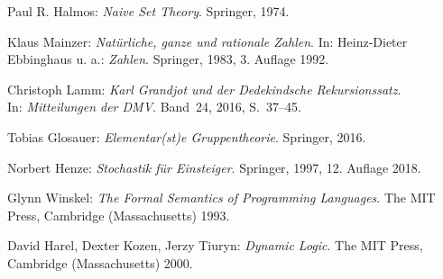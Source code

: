\begin{thebibliography}{00}
 Paul R. Halmos:
\emph{Naive Set Theory}. Springer, 1974.

 Klaus Mainzer:
\emph{Natürliche, ganze und rationale Zahlen}.
In: Heinz-Dieter Ebbinghaus u. a.: \emph{Zahlen}.
Springer, 1983, 3. Auflage 1992.

 Christoph Lamm:
\emph{Karl Grandjot und der Dedekindsche Rekursionssatz}.\\
In: \emph{Mitteilungen der DMV}. Band~24, 2016, S.~37--45.

 Tobias Glosauer:
\emph{Elementar(st)e Gruppentheorie}.
Springer, 2016.

 Norbert Henze: \emph{Stochastik für Einsteiger}.
Springer, 1997, 12. Auflage 2018.

 Glynn Winskel:
\emph{The Formal Semantics of Programming Languages}.
The MIT Press, Cambridge (Massachusetts) 1993.

 David Harel, Dexter Kozen, Jerzy Tiuryn:
\emph{Dynamic Logic}.
The MIT Press, Cambridge (Massachusetts) 2000.
\end{thebibliography}
